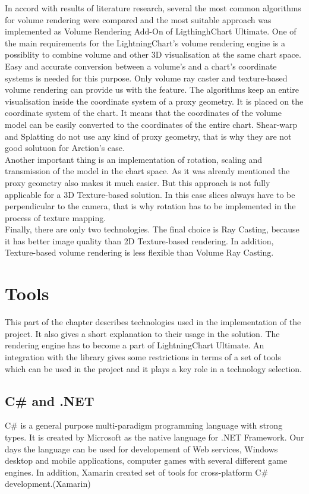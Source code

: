\documentclass[twoside, english, 11pt]{report}
\begin{document}
In accord with results of literature research, several the most common algorithms for volume rendering were compared and the most suitable approach was implemented as Volume Rendering Add-On of LigthinghChart Ultimate. One of the main requirements for the LightningChart's volume rendering engine is a possiblity to combine volume and other 3D visualisation at the same chart space. Easy and accurate conversion between a volume's and a chart's coordinate systems is needed for this  purpose. Only volume ray caster and texture-based volume rendering can provide us with the feature. The algorithms keep an entire visualisation inside the coordinate system of a proxy geometry. It is placed on the coordinate system of the chart. It means that the coordinates of the volume model can be easily converted to the coordinates of the entire chart. Shear-warp and Splatting do not use any kind of proxy geometry, that is why they are not good solutuon for Arction's case.\\

Another important thing is an implementation of rotation, scaling and transmission of the model in the chart space. As it was already mentioned the proxy geometry also makes it much easier. But this approach is not fully applicable for a 3D Texture-based solution. In this case slices always have to be perpendicular to the camera, that is why rotation has to be implemented in the process of texture mapping.\\

Finally, there are only two technologies. The final choice is Ray Casting, because it has better image quality than 2D Texture-based rendering. In addition, Texture-based volume rendering is less flexible than Volume Ray Casting.
\section{Tools}
This part of the chapter describes technologies used in the implementation of the project. It also gives a short explanation to their usage in the solution. The rendering engine has to become a part of LightningChart Ultimate. An integration with the library gives some restrictions in terms of a set of tools which can be used in the project and it plays a key role in a technology selection.
\subsection{C\# and .NET}
C\# is a general purpose multi-paradigm programming language with strong types. It is created by Microsoft as the native language for .NET Framework. Our days the language can be used for developement of Web services, Windows desktop and mobile applications, computer games with several different game engines. In addition, Xamarin created set of tools for cross-platform C\# development.(Xamarin)\\
\end{document}
